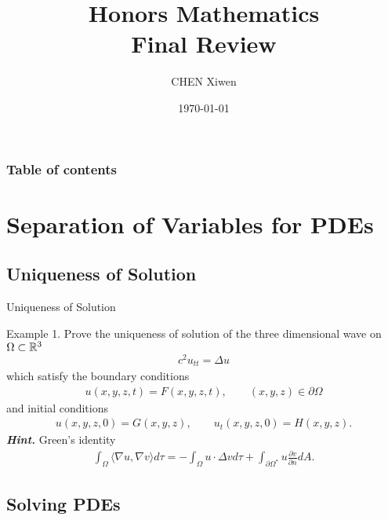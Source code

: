 \documentclass[hyperref={pdfpagelabels=true}]{beamer}
\title{Honors Mathematics \uppercase\expandafter{\romannumeral4}\\Final Review}
\author{CHEN Xiwen}
\date{\today}
\institute[UM-JI]{UM-SJTU Joint Institute}
\newcommand{\highlightr}[1]{\textcolor[rgb]{1,0.3,0.2}{\emph{\textbf{#1}}}}
\newcommand{\structb}[1]{\textcolor[rgb]{0.2,0.2,0.7}{#1}}
\begin{document}
\begin{frame}
\titlepage
\end{frame} 


\begin{frame}
\frametitle{Table of contents}
\tableofcontents
\end{frame} 


\section{Separation of Variables for PDEs}


\subsection{Uniqueness of Solution}


\begin{frame}{Uniqueness of Solution}

\justifying
\structb{Example 1.} Prove the uniqueness of solution of the three dimensional wave on $\Omega\subset\mathbb{R}^3$
\begin{align*}
c^2u_{tt} = \Delta u
\end{align*}
which satisfy the boundary conditions
\begin{align*}
u(x, y, z, t) = F(x, y, z, t), \qquad (x, y, z)\in \partial \Omega
\end{align*}
and initial conditions
\begin{align*}
u(x, y, z, 0) = G(x, y, z), \qquad u_t(x, y, z, 0) = H(x, y, z).
\end{align*}
\highlightr{Hint.} Green's identity
\begin{align*}
\int_{\Omega}\langle \nabla u, \nabla v\rangle d\tau = -\int_{\Omega} u\cdot\Delta v d\tau + \int_{\partial \Omega^*} u\frac{\partial v}{\partial n}dA.
\end{align*}

\end{frame}


\subsection{Solving PDEs}
\end{document}
